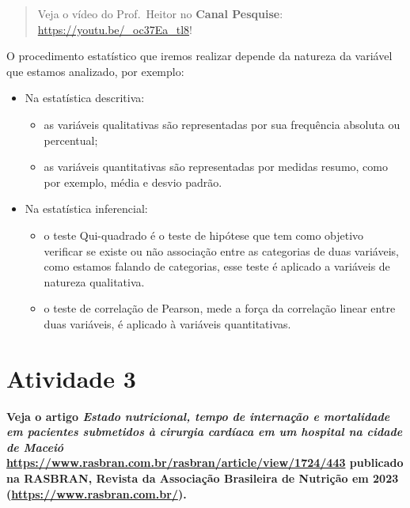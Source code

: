 \documentclass[
]{book}
\begin{document}
\begin{quote}
Veja o vídeo do Prof.~Heitor no \textbf{Canal Pesquise}: \url{https://youtu.be/_oc37Ea_tl8}!
\end{quote}

O procedimento estatístico que iremos realizar depende da natureza da variável que estamos analizado, por exemplo:

\begin{itemize}
\item
  Na estatística descritiva:

  \begin{itemize}
  \item
    as variáveis qualitativas são representadas por sua frequência absoluta ou percentual;
  \item
    as variáveis quantitativas são representadas por medidas resumo, como por exemplo, média e desvio padrão.
  \end{itemize}
\item
  Na estatística inferencial:

  \begin{itemize}
  \item
    o teste Qui-quadrado é o teste de hipótese que tem como objetivo verificar se existe ou não associação entre as categorias de duas variáveis, como estamos falando de categorias, esse teste é aplicado a variáveis de natureza qualitativa.
  \item
    o teste de correlação de Pearson, mede a força da correlação linear entre duas variáveis, é aplicado à variáveis quantitativas.
  \end{itemize}
\end{itemize}

\section{Atividade 3}\label{atividade-3}

\textbf{Veja o artigo \emph{Estado nutricional, tempo de internação e mortalidade em pacientes submetidos à cirurgia cardíaca em um hospital na cidade de Maceió} \url{https://www.rasbran.com.br/rasbran/article/view/1724/443} publicado na RASBRAN, Revista da Associação Brasileira de Nutrição em 2023 (\url{https://www.rasbran.com.br/}).}
\end{document}
